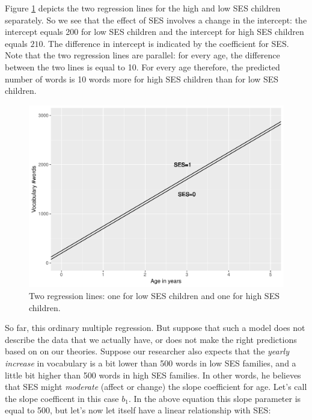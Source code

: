 \documentclass[]{report}\usepackage[]{graphicx}\usepackage[]{color}
\makeatletter
\def\maxwidth{ %
  \ifdim\Gin@nat@width>\linewidth
    \linewidth
  \else
    \Gin@nat@width
  \fi
}
\newenvironment{knitrout}{}{} %
\makeatother
\begin{document}
Figure \ref{fig:summary_plot0} depicts the two regression lines for the high and low SES children separately. So we see that the effect of SES involves a change in the intercept: the intercept equals 200 for low SES children and the intercept for high SES children equals $210$. The difference in intercept is indicated by the coefficient for SES. Note that the two regression lines are parallel: for every age, the difference between the two lines is equal to 10. For every age therefore, the predicted number of words is 10 words more for high SES children than for low SES children.


\begin{knitrout}
\color{fgcolor}\begin{figure}
\includegraphics[width=\maxwidth]{figure/summary_plot0-1} \caption[Two regression lines]{Two regression lines: one for low SES children and one for high SES children.}\label{fig:summary_plot0}
\end{figure}


\end{knitrout}

So far, this ordinary multiple regression. But suppose that such a model does not describe the data that we actually have, or does not make the right predictions based on on our theories. Suppose our researcher also expects that the \textit{yearly increase} in vocabulary is a bit lower than 500 words in low SES families, and a little bit higher than 500 words in high SES families. In other words, he believes that SES might \textit{moderate} (affect or change) the slope coefficient for age. Let's call the slope coefficent in this case $b_1$. In the above equation this slope parameter is equal to 500, but let's now let itself have a linear relationship with SES:
\end{document}
